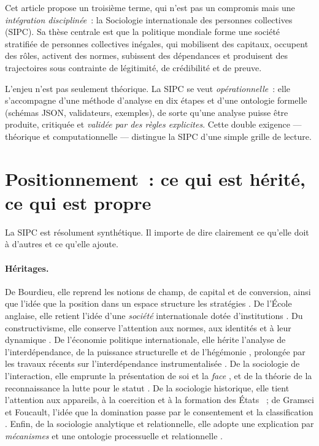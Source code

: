 \documentclass[11pt,a4paper]{article}
\begin{document}
Cet article propose un troisième terme, qui n'est pas un compromis mais une \emph{intégration
disciplinée}~: la Sociologie internationale des personnes collectives (SIPC). Sa thèse centrale
est que la politique mondiale forme une société stratifiée de personnes collectives inégales,
qui mobilisent des capitaux, occupent des rôles, activent des normes, subissent des dépendances
et produisent des trajectoires sous contrainte de légitimité, de crédibilité et de preuve.

L'enjeu n'est pas seulement théorique. La SIPC se veut \emph{opérationnelle}~: elle s'accompagne
d'une méthode d'analyse en dix étapes et d'une ontologie formelle (schémas JSON, validateurs,
exemples), de sorte qu'une analyse puisse être produite, critiquée et \emph{validée par des
règles explicites}. Cette double exigence --- théorique et computationnelle --- distingue la
SIPC d'une simple grille de lecture.

\section{Positionnement~: ce qui est hérité, ce qui est propre}
\label{sec:positionnement}

La SIPC est résolument synthétique. Il importe de dire clairement ce qu'elle doit à d'autres et
ce qu'elle ajoute.

\paragraph{Héritages.} De Bourdieu, elle reprend les notions de champ, de capital et de
conversion, ainsi que l'idée que la position dans un espace structure les stratégies
\autocite{bourdieu1979,bourdieuWacquant1992}. De l'École anglaise, elle retient l'idée d'une
\emph{société} internationale dotée d'institutions \autocite{bull1977,buzan2004}. Du
constructivisme, elle conserve l'attention aux normes, aux identités et à leur dynamique
\autocite{wendt1999,finnemoreSikkink1998,barnettFinnemore2004}. De l'économie politique
internationale, elle hérite l'analyse de l'interdépendance, de la puissance structurelle et de
l'hégémonie \autocite{keohaneNye1977,strange1988,gilpin1987}, prolongée par les travaux récents
sur l'interdépendance instrumentalisée \autocite{farrellNewman2019}. De la sociologie de
l'interaction, elle emprunte la présentation de soi et la \emph{face}
\autocite{goffman1959}, et de la théorie de la reconnaissance la lutte pour le statut
\autocite{honneth1995,ringmar1996}. De la sociologie historique, elle tient l'attention aux
appareils, à la coercition et à la formation des États \autocite{weber1978,tilly1992,mann1986}~;
de Gramsci et Foucault, l'idée que la domination passe par le consentement et la classification
\autocite{gramsci1971,foucault1977}. Enfin, de la sociologie analytique et relationnelle, elle
adopte une explication par \emph{mécanismes} \autocite{hedstromSwedberg1998,elster1989} et une
ontologie processuelle et relationnelle \autocite{emirbayer1997,abbott2016,nexon2009,pouliot2016}.
\end{document}
